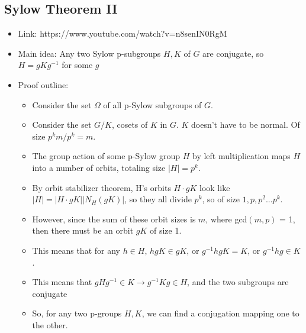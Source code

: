\documentclass[11pt, oneside]{article}   	%
\begin{document}
\subsection{Sylow Theorem II}
\begin{itemize}
\item Link: https://www.youtube.com/watch?v=n8senIN0RgM
\item Main idea: Any two Sylow p-subgroups $H, K$ of $G$ are conjugate, so $H = gKg^{-1}$ for some $g$
\item Proof outline:
\begin{itemize}
\item Consider the set $\Omega$ of all p-Sylow subgroups of $G$.
\item Consider the set $G / K$, cosets of $K$ in $G$.  $K$ doesn't have to be normal.  Of size $p^km/p^k = m$.  
\item The group action of some p-Sylow group $H$ by left multiplication maps $H$ into a number of orbits, totaling size $|H| = p^k$.
\item By orbit stabilizer theorem, H's orbits $H \cdot gK$ look like $|H| = |H \cdot gK| |N_H(gK)|$, so they all divide $p^k$, so of size $1, p, p^2 ... p^k$.  
\item However, since the sum of these orbit sizes is $m$, where gcd$(m, p)$ = 1, then there must be an orbit $gK$ of size 1.
\item This means that for any $h \in H$, $hgK \in gK$, or $g^{-1}hgK = K$, or $g^{-1}hg \in K$.  
\item This means that $gHg^{-1} \in K \rightarrow g^{-1}Kg \in H$, and the two subgroups are conjugate
\item So, for any two p-groups $H, K$, we can find a conjugation mapping one to the other.
\end{itemize}

\end{itemize}
\end{document}
